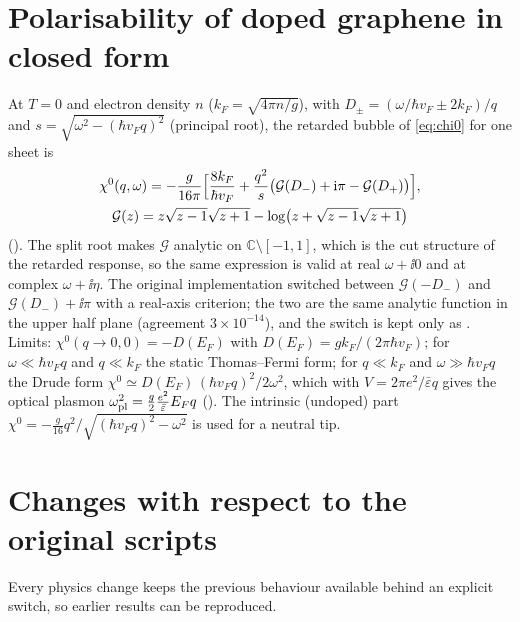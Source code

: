 \section{Polarisability of doped graphene in closed form}
\label{app:dirac}

At $T=0$ and electron density $n$ ($k_F=\sqrt{4\pi n/g}$), with $D_\pm=(\omega/\hbar v_F\pm2k_F)/q$ and
$s=\sqrt{\omega^2-(\hbar v_Fq)^2}$ (principal root), the retarded bubble of \cref{eq:chi0} for one sheet
is~\cite{Wunsch2006}
\begin{gather}
\chi^0(q,\omega)=-\frac{g}{16\pi}\Bigl[\frac{8k_F}{\hbar v_F}+\frac{q^2}{s}\bigl(\mathcal G(D_-)+\mathrm i\pi-\mathcal G(D_+)\bigr)\Bigr],\nonumber\\
\mathcal G(z)=z\sqrt{z-1}\sqrt{z+1}-\log\bigl(z+\sqrt{z-1}\sqrt{z+1}\bigr)
\end{gather}
(). The split root makes $\mathcal G$ analytic on $\mathbb C\setminus[-1,1]$, which is the
cut structure of the retarded response, so the same expression is valid at real $\omega+\ii0$ and at complex
$\omega+\ii\eta$. The original implementation switched between $\mathcal G(-D_-)$ and $\mathcal G(D_-)+\ii\pi$ with a
real-axis criterion; the two are the same analytic function in the upper half plane (agreement $3\times10^{-14}$),
and the switch is kept only as . Limits: $\chi^0(q\to0,0)=-D(E_F)$
with $D(E_F)=gk_F/(2\pi\hbar v_F)$; for $\omega\ll\hbar v_Fq$ and $q\ll k_F$ the static Thomas--Fermi form; for $q\ll k_F$
and $\omega\gg\hbar v_Fq$ the Drude form $\chi^0\simeq D(E_F)\,(\hbar v_Fq)^2/2\omega^2$, which with
$V=2\pi e^2/\bar\varepsilon q$ gives the optical plasmon
$\omega_{\rm pl}^2=\frac{g}{2}\frac{e^2}{\bar\varepsilon}E_Fq$ ().
The intrinsic (undoped) part $\chi^0=-\frac{g}{16}q^2/\sqrt{(\hbar v_Fq)^2-\omega^2}$ is used for a neutral tip.

\section{Changes with respect to the original scripts}
\label{app:changes}

Every physics change keeps the previous behaviour available behind an explicit switch, so earlier results can
be reproduced.

